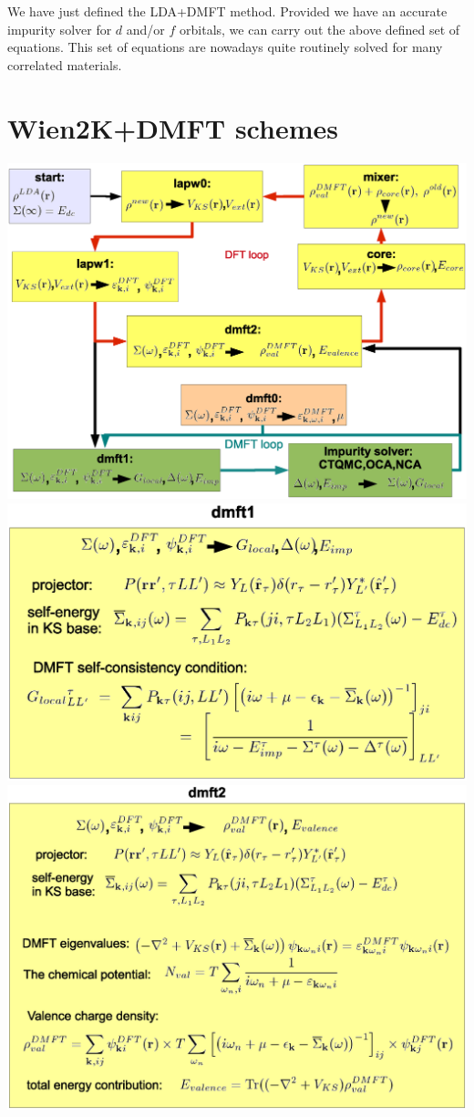 \documentclass[usenames,letter,landscape,semhelv]{seminar}
\begin{document}
\begin{slide}
We have just defined the LDA+DMFT method. Provided we have an accurate
impurity solver for $d$ and/or $f$ orbitals, we can carry out the
above defined set of equations. This set of equations are nowadays
quite routinely solved for many correlated materials.


\section{Wien2K+DMFT schemes}

\newslide
\includegraphics[width=1.0\linewidth]{lda+dmft-scheme1.eps}
\includegraphics[width=1.0\linewidth]{lda+dmft-scheme2.eps}
\includegraphics[width=1.0\linewidth]{lda+dmft-scheme3.eps}





\end{slide}
\end{document}
